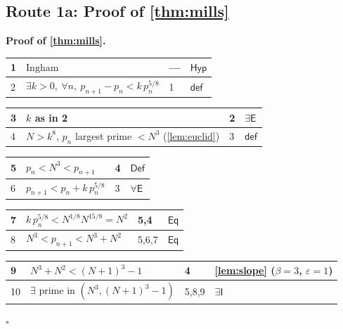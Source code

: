 \documentclass[11pt,reqno]{amsart}
\theoremstyle{blueplain}
\renewcommand{\qedsymbol}{\textcolor{proofqed}{\ensuremath{\square}}}
\renewenvironment{proof}[1][Proof]{\par\noindent\textbf{\textcolor{proofhead}{#1.}}\par\nobreak}{\par\nobreak\hfill\qedsymbol}
\numberwithin{equation}{section}
\begin{document}
\subsection{Route 1a: Proof of \cref{thm:mills}}

\begin{proof}[\textbf{Proof of \cref{thm:mills}}]
	\label{proof:mills}
	{\scriptsize
		\begin{tabular}{|m{0.7cm}|m{12cm}|m{1.4cm}|m{2.5cm}|}
			\hline
			1 & $\text{Ingham}$ & --- & $\mathsf{Hyp}$ \\ \hline
			2 & $\exists k>0,\ \forall n,\ p_{n+1}-p_n<k\,p_n^{5/8}$ & 1 & $\mathsf{def}$ \\
		\end{tabular}%
		\noindent \newline
		\noindent
		\begin{tabular}{|m{0.7cm}|m{12cm}|m{1.4cm}|m{2.5cm}|}
			\hline
			3 & $k$ as in 2 & 2 & $\exists\mathsf{E}$ \\ \hline
			4 & $N>k^{8}$, $p_n$ largest prime $<N^{3}$ (\cref{lem:euclid}) & 3 & $\mathsf{def}$ \\
		\end{tabular}%
		\noindent \newline
		\noindent
		\begin{tabular}{|m{0.7cm}|m{12cm}|m{1.4cm}|m{2.5cm}|}
			\hline
			5 & $p_n<N^{3}<p_{n+1}$ & 4 & $\mathsf{Def}$ \\ \hline
			6 & $p_{n+1}<p_n+k\,p_n^{5/8}$ & 3 & $\forall\mathsf{E}$ \\
		\end{tabular}%
		\noindent \newline
		\noindent
		\begin{tabular}{|m{0.7cm}|m{12cm}|m{1.4cm}|m{2.5cm}|}
			\hline
			7 & $k\,p_n^{5/8}<N^{1/8}N^{15/8}=N^{2}$ & 5,4 & $\mathsf{Eq}$ \\ \hline
			8 & $N^{3}<p_{n+1}<N^{3}+N^{2}$ & 5,6,7 & $\mathsf{Eq}$ \\
		\end{tabular}%
		\noindent \newline
		\noindent
		\begin{tabular}{|m{0.7cm}|m{12cm}|m{1.4cm}|m{2.5cm}|}
			\hline
			9 & $N^{3}+N^{2}<(N+1)^{3}-1$ & 4 & \cref{lem:slope} ($\beta=3$, $\varepsilon=1$) \\ \hline
			10 & $\exists$ prime in $(N^{3},(N+1)^{3}-1)$ & 5,8,9 & $\exists\mathsf{I}$ \\

\end{tabular}}
\end{proof}
\end{document}
